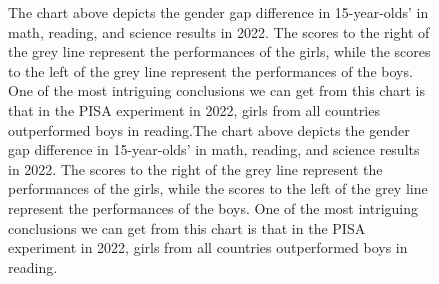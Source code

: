 \documentclass[
  11pt,
  a4paper,
]{article}
\begin{document}
\begin{figure}[H]


\caption{\label{fig-diff}The chart above depicts the gender gap
difference in 15-year-olds' in math, reading, and science results in
2022. The scores to the right of the grey line represent the
performances of the girls, while the scores to the left of the grey line
represent the performances of the boys. One of the most intriguing
conclusions we can get from this chart is that in the PISA experiment in
2022, girls from all countries outperformed boys in reading.The chart
above depicts the gender gap difference in 15-year-olds' in math,
reading, and science results in 2022. The scores to the right of the
grey line represent the performances of the girls, while the scores to
the left of the grey line represent the performances of the boys. One of
the most intriguing conclusions we can get from this chart is that in
the PISA experiment in 2022, girls from all countries outperformed boys
in reading.}

\end{figure}%
\end{document}
